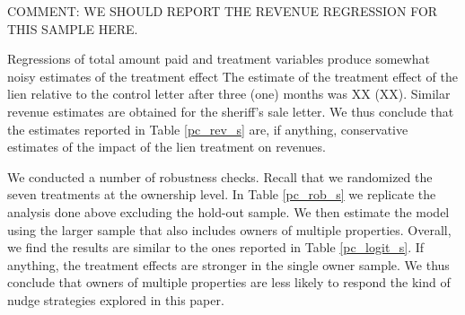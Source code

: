 \documentclass[12pt]{article}
\begin{document}
\noindent COMMENT: WE SHOULD REPORT THE REVENUE REGRESSION FOR THIS SAMPLE HERE. 

Regressions of total amount paid and treatment variables produce somewhat noisy estimates of the treatment effect
The estimate of the treatment effect of the lien relative to the control letter after three (one) months was XX (XX). Similar  revenue estimates are obtained for the sheriff's sale letter.  We thus conclude that  the estimates reported in Table \ref{pc_rev_s} are, if anything, conservative estimates of the impact of the lien treatment on revenues.

We conducted a number of robustness checks. Recall that we randomized the seven treatments at the ownership level. In Table \ref{pc_rob_s} we replicate the analysis done above excluding the hold-out sample. We then estimate the model using the larger sample that also includes owners of multiple properties. Overall, we find the results
are similar to the ones reported in Table \ref{pc_logit_s}. If anything, the treatment effects are stronger in the single owner sample. We thus conclude that owners of multiple properties are less likely to respond the kind of nudge strategies explored in this paper.
\end{document}
